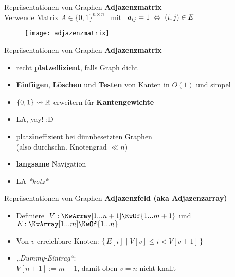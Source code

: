 \begin{frame}{Repräsentationen von Graphen}
	\textbf{Adjazenzmatrix} \\
	Verwende Matrix $A \in \{0, 1\}^{n \times n}$ \ mit \ $a_{ij} = 1 \gdw (i, j) \in E$
	\begin{figure}[htp]
		\centering
		\texttt{[image: adjazenzmatrix]}
	\end{figure}
\end{frame}

\begin{frame}{Repräsentationen von Graphen}
	\textbf{Adjazenzmatrix} 
	\begin{itemize}
		\item[\Pros] recht \textbf{platzeffizient}, falls Graph dicht
		\pause
		\item[\Pros] \textbf{Einfügen}, \textbf{Löschen}  und \textbf{Testen} von Kanten in $O(1)$ und simpel
		\pause
		\item[\Pros] $\{0, 1\} \rightsquigarrow \mathbb{R}$ erweitern für \textbf{Kantengewichte}
		\pause
		\item[\Pros] LA, yay! :D
	\end{itemize}
	\begin{itemize}
		\pause
		\item[\Cons] platz\textbf{in}effizient bei dünnbesetzten Graphen \\ 
		{\small (also durchschn. Knotengrad $\ll n$)}
		\pause
		\item[\Cons] \textbf{langsame} Navigation
		\pause
		\item[\Cons] LA \textit{*kotz*} 
	\end{itemize}
\end{frame}

\begin{frame}{Repräsentationen von Graphen}
	\textbf{Adjazenzfeld (aka Adjazenzarray)} 
	\begin{itemize}
		\item 
			\begin{tabbing}
				Definiere \= $V : \KwArray[1...n+1] \KwOf \{1 ... m+1\}$ und \\
				\> $E : \KwArray[1...m] \KwOf \{1...n\}$
			\end{tabbing}
		\pause
		\item Von $v$ erreichbare Knoten: $\big\lbrace\, E[i] \mid V[v] \leq i < V[v+1] \, \big\rbrace$
		\pause
		\item \emph{„Dummy-Eintrag“}: \\
		$V[n+1] := m+1$, damit oben $v = n$ nicht knallt
	\end{itemize}
\end{frame}

